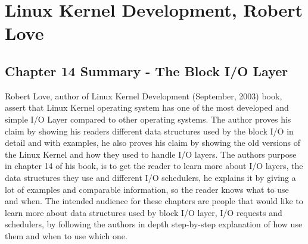 \documentclass[letterpaper,10pt,draftclsnofoot,onecolumn]{IEEEtran}
\begin{document}


	
\section*{Linux Kernel Development, Robert Love}
\subsection*{Chapter 14 Summary - The Block I/O Layer}

Robert Love, author of Linux Kernel Development (September, 2003) book, assert that Linux Kernel operating system has one of the most developed and simple I/O Layer compared to other operating systems. The author proves his claim by showing his readers different data structures used by the block I/O in detail and with examples, he also proves his claim by showing the old versions of the Linux Kernel and how they used to handle I/O layers. The author\textquotesingle s purpose in chapter 14 of his book, is to get the reader to learn more about I/O layers, the data structures they use and different I/O schedulers, he explains it by giving a lot of examples and comparable information, so the reader knows what to use and when. The intended audience for these chapters are people that would like to learn more about data structures used by block I/O layer, I/O requests and schedulers, by following the author\textquotesingle s in depth step-by-step explanation of how use them and when to use which one.
\end{document}
